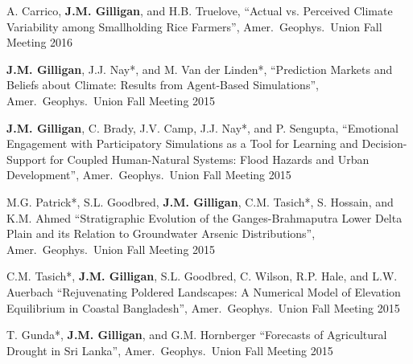     \item 
    A. Carrico, \textbf{J.M. Gilligan}, and H.B. Truelove,
    \enquote{Actual vs. Perceived Climate Variability among Smallholding Rice Farmers},
    Amer.\ Geophys.\ Union Fall Meeting 2016

    \item \textbf{J.M. Gilligan}, J.J. Nay*, and M. Van der Linden*,
    \enquote{Prediction Markets and Beliefs about Climate: Results from Agent-Based Simulations},
    Amer.\ Geophys.\ Union Fall Meeting 2015
    
    \item \textbf{J.M. Gilligan}, C. Brady, J.V. Camp, J.J. Nay*, and P. Sengupta,
    \enquote{Emotional Engagement with Participatory Simulations as a Tool for Learning and Decision-Support for Coupled Human-Natural Systems: Flood Hazards and Urban Development},
    Amer.\ Geophys.\ Union Fall Meeting 2015
    
    \item M.G. Patrick*, S.L. Goodbred, \textbf{J.M. Gilligan}, C.M. Tasich*, S. Hossain, and K.M. Ahmed
    \enquote{Stratigraphic Evolution of the Ganges-Brahmaputra Lower Delta Plain and its Relation to Groundwater Arsenic Distributions},
    Amer.\ Geophys.\ Union Fall Meeting 2015

    \item C.M. Tasich*, \textbf{J.M. Gilligan}, S.L. Goodbred, C. Wilson, R.P. Hale, and L.W. Auerbach
    \enquote{Rejuvenating Poldered Landscapes: A Numerical Model of Elevation Equilibrium in Coastal Bangladesh},
    Amer.\ Geophys.\ Union Fall Meeting 2015

    \item T. Gunda*, \textbf{J.M. Gilligan}, and G.M. Hornberger
    \enquote{Forecasts of Agricultural Drought in Sri Lanka},
    Amer.\ Geophys.\ Union Fall Meeting 2015  
